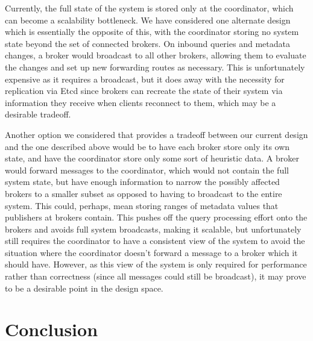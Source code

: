 \documentclass[conference]{IEEEtran}
\begin{document}
Currently, the full state of the system is stored only at the coordinator, which can become a scalability bottleneck.
We have considered one alternate design which is essentially the opposite of this, with the coordinator storing no system state beyond the set of connected brokers. 
On inbound queries and metadata changes, a broker would broadcast to all other brokers, allowing them to evaluate the changes and set up new forwarding routes as necessary.
This is unfortunately expensive as it requires a broadcast, but it does away with the necessity for replication via Etcd since brokers can recreate the state of their system via information they receive when clients reconnect to them, which may be a desirable tradeoff.

Another option we considered that provides a tradeoff between our current design and the one described above would be to have each broker store only its own state, and have the coordinator store only some sort of heuristic data.
A broker would forward messages to the coordinator, which would not contain the full system state, but have enough information to narrow the possibly affected brokers to a smaller subset as opposed to having to broadcast to the entire system.
This could, perhaps, mean storing ranges of metadata values that publishers at brokers contain.
This pushes off the query processing effort onto the brokers and avoids full system broadcasts, making it scalable, but unfortunately still requires the coordinator to have a consistent view of the system to avoid the situation where the coordinator doesn't forward a message to a broker which it should have.
However, as this view of the system is only required for performance rather than correctness (since all messages could still be broadcast), it may prove to be a desirable point in the design space.


\section{Conclusion}



\end{document}
